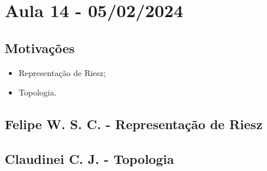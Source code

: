 \documentclass[MeasureTheory/measure_theory.tex]{subfiles}
\begin{document}
\section{Aula 14 - 05/02/2024}
\subsection{Motivações}
\begin{itemize}
	\item Representação de Riesz;
	\item Topologia.
\end{itemize}
\subsection{Felipe W. S. C. - Representação de Riesz}
\subsection{Claudinei C. J. - Topologia}
\end{document}
